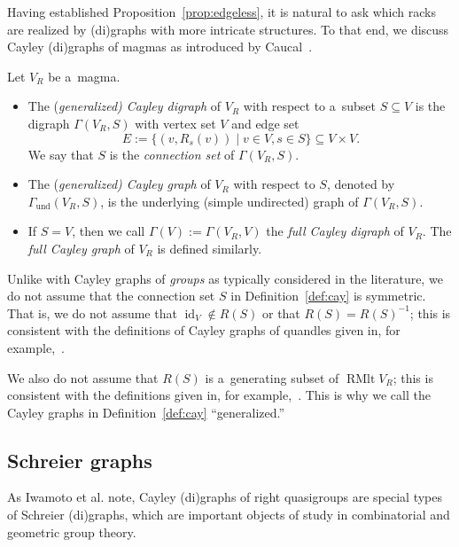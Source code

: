 \documentclass{jonasart}
\DeclareMathOperator{\id}{id}
\DeclareMathOperator{\RMlt}{RMlt}
\newcommand{\inv}{^{-1}}
\newcommand{\und}{\mathrm{und}}
\begin{document}
    Having established Proposition~\ref{prop:edgeless}, it is natural to ask which racks are realized by (di)graphs with more intricate structures. To that end, we discuss Cayley (di)graphs of magmas as introduced by Caucal~\cite{caucal}.

	\begin{definition}\label{def:cay}
		Let $V_R$ be a~magma.
		\begin{itemize}
			\item The (\emph{generalized\textup{)} Cayley digraph} of $V_R$ with respect to a~subset $S\subseteq V$ is the digraph $\Gamma(V_R,S)$ with vertex set $V$ and edge set
			\[
				E:=\{(v,R_s(v))\mid v\in V,s\in S\}\subseteq V\times V.
			\]
			We say that $S$ is the \emph{connection set} of $\Gamma(V_R,S)$.
			\item The (\emph{generalized\textup{)} Cayley graph} of $V_R$ with respect to $S$, denoted by $\Gamma_{\und}(V_R,S)$, is the underlying (simple undirected) graph of $\Gamma(V_R,S)$.
			\item If $S=V$, then we call $\Gamma(V):=\Gamma(V_R,V)$ the \emph{full Cayley digraph} of $V_R$. The \emph{full Cayley graph} of $V_R$ is defined similarly.
		\end{itemize}
	\end{definition}

	\begin{remark}
		Unlike with Cayley graphs of \emph{groups} as typically considered in the literature, we do not assume that the connection set $S$ in Definition~\ref{def:cay} is symmetric. That is, we do not assume that $\id_V\notin R(S)$ or that $R(S)=R(S)\inv$; this is consistent with the definitions of Cayley graphs of quandles given in, for example,~\cite{winker, textbook, metrics}.

		We also do not assume that $R(S)$ is a~generating subset of $\RMlt V_R$; this is consistent with the definitions given in, for example,~\cite{caucal, caucal2}. This is why we call the Cayley graphs in Definition~\ref{def:cay} ``generalized.''
	\end{remark}
    
	\subsection{Schreier graphs}
	
    As Iwamoto et al. \cite{metrics} note, Cayley (di)graphs of right quasigroups are special types of Schreier (di)graphs, which are important objects of study in combinatorial and geometric group theory.
\end{document}
